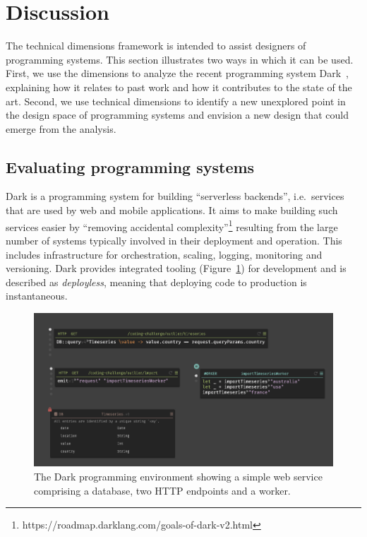 \hypertarget{discussion}{%
\section{Discussion}\label{discussion}}

The technical dimensions framework is intended to assist designers of
programming systems. This section illustrates two ways in which it can
be used. First, we use the dimensions to analyze the recent programming
system Dark~\cite{DarkWeb}, explaining how it relates to past work and
how it contributes to the state of the art. Second, we use technical
dimensions to identify a new unexplored point in the design space of
programming systems and envision a new design that could emerge from the
analysis.

\hypertarget{evaluating-programming-systems}{%
\subsection{Evaluating programming
systems}\label{evaluating-programming-systems}}

Dark is a programming system for building ``serverless backends'',
i.e.~services that are used by web and mobile applications. It aims to
make building such services easier by ``removing accidental
complexity''\footnote{https://roadmap.darklang.com/goals-of-dark-v2.html}
resulting from the large number of systems typically involved in their
deployment and operation. This includes infrastructure for
orchestration, scaling, logging, monitoring and versioning. Dark
provides integrated tooling (Figure~\ref{fig:dark}) for development and
is described as \emph{deployless}, meaning that deploying code to
production is instantaneous.

\begin{figure}
  \centering
  \includegraphics[width=1\linewidth]{dark.png}
  \caption{The Dark programming environment showing a simple web service comprising a database, two HTTP endpoints and a worker.\label{fig:dark}}
\end{figure}

